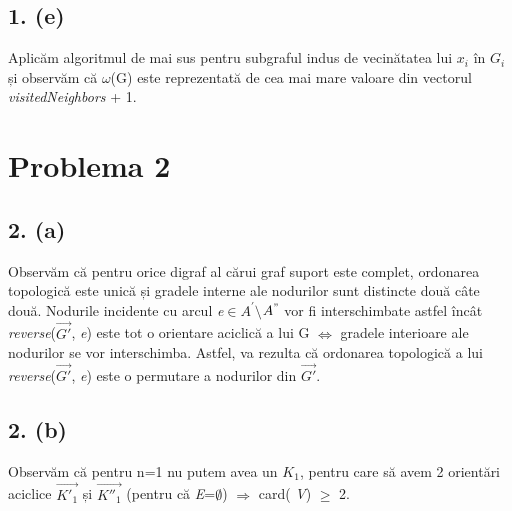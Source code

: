\documentclass[12pt] {fphw}
\begin{document}
\subsection*{1. (e)}
Aplicăm algoritmul de mai sus pentru subgraful indus de vecinătatea lui {$x_i$} în {$G_i$} și observăm că $\omega$(G) este reprezentată de cea mai mare valoare din vectorul  \textit{visitedNeighbors} + 1. 

\section*{Problema 2}
\subsection*{2. (a)}
Observăm că pentru orice digraf al cărui graf suport este complet, ordonarea topologică este unică și gradele interne ale nodurilor sunt distincte două câte două. Nodurile incidente cu arcul \textit{e}$\in$$A^{'}$$\setminus$$A^{"}$ vor fi interschimbate astfel încât  \textit{reverse}($\vec{G'}$, \textit{e}) este tot o orientare aciclică a lui G $\Longleftrightarrow$ gradele interioare ale nodurilor se vor interschimba. Astfel, va rezulta că ordonarea topologică a lui \textit{reverse}($\vec{G'}$, \textit{e}) este o permutare a nodurilor din $\vec{G'}$.
 
\subsection*{2. (b)}
Observăm că pentru n=1 nu putem avea un ${}K_1$, pentru care să avem 2 orientări aciclice $\vec{K'_1}$  și $\vec{K''_1}$ (pentru că \textit{E}=$\emptyset$)
$\Longrightarrow$ card( \textit{V}) $\geq$ 2. 
\end{document}
